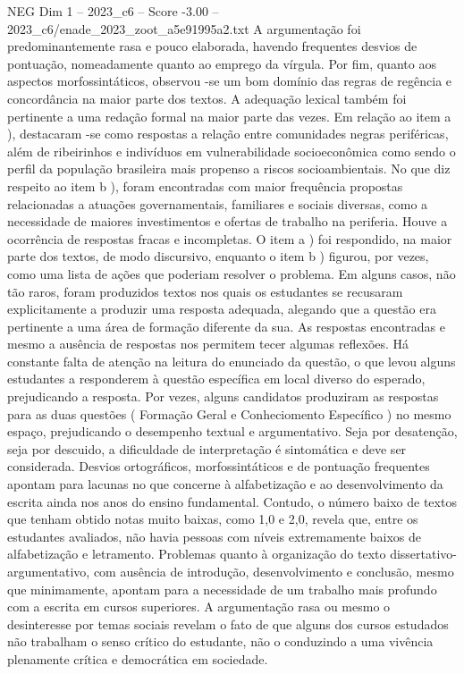 \begin{textsample}{NEG Dim 1 – 2023\_c6 – Score -3.00 – 2023\_c6/enade\_2023\_zoot\_a5e91995a2.txt}
A argumentação foi predominantemente rasa e pouco elaborada, havendo frequentes desvios de pontuação, nomeadamente quanto ao emprego da vírgula.
Por fim, quanto aos aspectos morfossintáticos, observou -se um bom domínio das regras de regência e concordância na maior parte dos textos.
A adequação lexical também foi pertinente a uma redação formal na maior parte das vezes.
Em relação ao item a ), destacaram -se como respostas a relação entre comunidades negras periféricas, além de ribeirinhos e indivíduos em vulnerabilidade socioeconômica como sendo o perfil da população brasileira mais propenso a riscos socioambientais.
No que diz respeito ao item b ), foram encontradas com maior frequência propostas relacionadas a atuações governamentais, familiares e sociais diversas, como a necessidade de maiores investimentos e ofertas de trabalho na periferia.
Houve a ocorrência de respostas fracas e incompletas.
O item a ) foi respondido, na maior parte dos textos, de modo discursivo, enquanto o item b ) figurou, por vezes, como uma lista de ações que poderiam resolver o problema.
Em alguns casos, não tão raros, foram produzidos textos nos quais os estudantes se recusaram explicitamente a produzir uma resposta adequada, alegando que a questão era pertinente a uma área de formação diferente da sua.
As respostas encontradas e mesmo a ausência de respostas nos permitem tecer algumas reflexões.
Há constante falta de atenção na leitura do enunciado da questão, o que levou alguns estudantes a responderem à questão específica em local diverso do esperado, prejudicando a resposta.
Por vezes, alguns candidatos produziram as respostas para as duas questões ( Formação Geral e Conheciomento Específico ) no mesmo espaço, prejudicando o desempenho textual e argumentativo.
Seja por desatenção, seja por descuido, a dificuldade de interpretação é sintomática e deve ser considerada.
Desvios ortográficos, morfossintáticos e de pontuação frequentes apontam para lacunas no que concerne à alfabetização e ao desenvolvimento da escrita ainda nos anos do ensino fundamental.
Contudo, o número baixo de textos que tenham obtido notas muito baixas, como 1,0 e 2,0, revela que, entre os estudantes avaliados, não havia pessoas com níveis extremamente baixos de alfabetização e letramento.
Problemas quanto à organização do texto dissertativo-argumentativo, com ausência de introdução, desenvolvimento e conclusão, mesmo que minimamente, apontam para a necessidade de um trabalho mais profundo com a escrita em cursos superiores.
A argumentação rasa ou mesmo o desinteresse por temas sociais revelam o fato de que alguns dos cursos estudados não trabalham o senso crítico do estudante, não o conduzindo a uma vivência plenamente crítica e democrática em sociedade.

\end{textsample}
